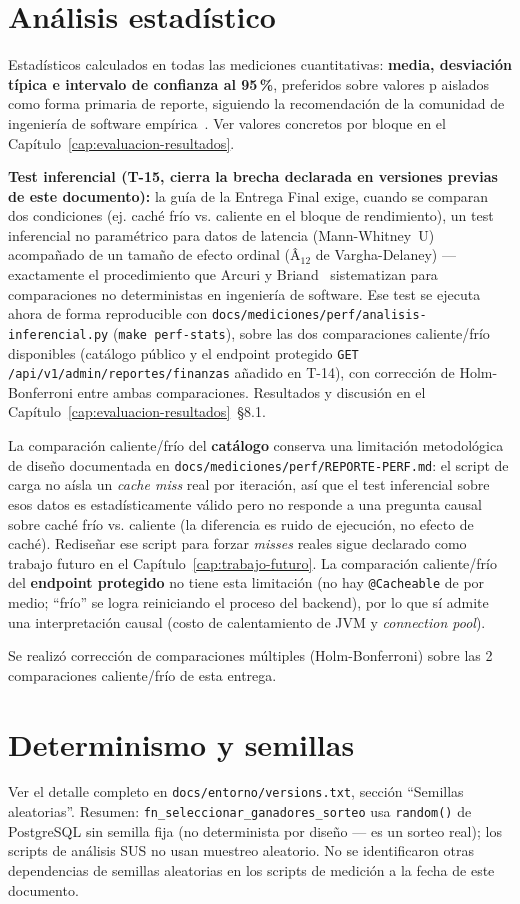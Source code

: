 \section{Análisis estadístico}

Estadísticos calculados en todas las mediciones cuantitativas:
\textbf{media, desviación típica e intervalo de confianza al 95\,\%},
preferidos sobre valores p aislados como forma primaria de reporte,
siguiendo la recomendación de la comunidad de ingeniería de software
empírica~\cite{WOHLIN2012,ARCURI2011}. Ver valores concretos por bloque en
el Capítulo~\ref{cap:evaluacion-resultados}.

\textbf{Test inferencial (T-15, cierra la brecha declarada en versiones
previas de este documento):} la guía de la Entrega Final exige, cuando se
comparan dos condiciones (ej. caché frío vs. caliente en el bloque de
rendimiento), un test inferencial no paramétrico para datos de latencia
(Mann-Whitney~U) acompañado de un tamaño de efecto ordinal (Â$_{12}$ de
Vargha-Delaney) --- exactamente el procedimiento que Arcuri y
Briand~\cite{ARCURI2011} sistematizan para comparaciones no deterministas
en ingeniería de software. Ese test se ejecuta ahora de forma
reproducible con \texttt{docs/mediciones/perf/analisis-inferencial.py}
(\texttt{make perf-stats}), sobre las dos comparaciones caliente/frío
disponibles (catálogo público y el endpoint protegido
\texttt{GET /api/v1/admin/reportes/finanzas} añadido en T-14), con
corrección de Holm-Bonferroni entre ambas comparaciones. Resultados y
discusión en el Capítulo~\ref{cap:evaluacion-resultados}~\S8.1.

La comparación caliente/frío del \textbf{catálogo} conserva una
limitación metodológica de diseño documentada en
\texttt{docs/mediciones/perf/REPORTE-PERF.md}: el script de carga no
aísla un \emph{cache miss} real por iteración, así que el test
inferencial sobre esos datos es estadísticamente válido pero no responde
a una pregunta causal sobre caché frío vs. caliente (la diferencia es
ruido de ejecución, no efecto de caché). Rediseñar ese script para forzar
\emph{misses} reales sigue declarado como trabajo futuro en el
Capítulo~\ref{cap:trabajo-futuro}. La comparación caliente/frío del
\textbf{endpoint protegido} no tiene esta limitación (no hay
\texttt{@Cacheable} de por medio; ``frío'' se logra reiniciando el
proceso del backend), por lo que sí admite una interpretación causal
(costo de calentamiento de JVM y \emph{connection pool}).

Se realizó corrección de comparaciones múltiples (Holm-Bonferroni) sobre
las 2 comparaciones caliente/frío de esta entrega.

\section{Determinismo y semillas}

Ver el detalle completo en \texttt{docs/entorno/versions.txt}, sección
``Semillas aleatorias''. Resumen: \texttt{fn\_seleccionar\_ganadores\_sorteo}
usa \texttt{random()} de PostgreSQL sin semilla fija (no determinista por
diseño --- es un sorteo real); los scripts de análisis SUS no usan
muestreo aleatorio. No se identificaron otras dependencias de semillas
aleatorias en los scripts de medición a la fecha de este documento.
